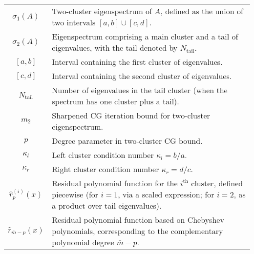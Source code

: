 \begin{longtable}{c p{10cm}}
    $\sigma_1(A)$                    & Two-cluster eigenspectrum of $A$, defined as the union of two intervals $[a,b] \cup [c,d]$.                                                                        \\
    $\sigma_2(A)$                    & Eigenspectrum comprising a main cluster and a tail of eigenvalues, with the tail denoted by $N_{\text{tail}}$.                                                     \\
    $[a,b]$                          & Interval containing the first cluster of eigenvalues.                                                                                                              \\
    $[c,d]$                          & Interval containing the second cluster of eigenvalues.                                                                                                             \\
    $N_{\text{tail}}$                & Number of eigenvalues in the tail cluster (when the spectrum has one cluster plus a tail).                                                                         \\
    $m_2$                            & Sharpened CG iteration bound for two-cluster eigenspectrum.                                                                                                        \\
    $p$                              & Degree parameter in two-cluster CG bound.                                                                                                                          \\
    $\kappa_l$                       & Left cluster condition number $\kappa_l = b/a$.                                                                                                                    \\
    $\kappa_r$                       & Right cluster condition number $\kappa_r = d/c$.                                                                                                                   \\
    $\hat{r}^{(i)}_p(x)$             & Residual polynomial function for the $i^\text{th}$ cluster, defined piecewise (for $i=1$, via a scaled expression; for $i=2$, as a product over tail eigenvalues). \\
    $\hat{r}_{\bar{m}-p}(x)$         & Residual polynomial function based on Chebyshev polynomials, corresponding to the complementary polynomial degree $\bar{m}-p$.                                     \\

\end{longtable}
